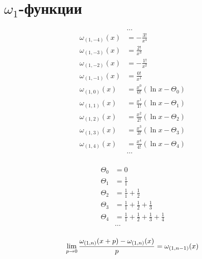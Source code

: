 
\section{$\omega_1$-функции}

\begin{equation*} \begin{aligned}
&\ldots \\
\omega_{(1, -4)}(x) &=
- \frac{3!}{x^4} \\
\omega_{(1, -3)}(x) &=
  \frac{2!}{x^3} \\
\omega_{(1, -2)}(x) &=
- \frac{1!}{x^2} \\
\omega_{(1, -1)}(x) &=
  \frac{0!}{x^1} \\
\omega_{(1, 0)}(x) &= 
  \frac{x^0}{0!} \left(
  \ln{x} - \Theta_0 \right) \\
\omega_{(1, 1)}(x) &= 
  \frac{x^1}{1!} \left(
  \ln{x} - \Theta_1 \right) \\
\omega_{(1, 2)}(x) &= 
  \frac{x^2}{2!} \left(
  \ln{x} - \Theta_2 \right) \\
\omega_{(1, 3)}(x) &= 
  \frac{x^3}{3!} \left(
  \ln{x} - \Theta_3 \right) \\
\omega_{(1, 4)}(x) &= 
  \frac{x^4}{4!} \left(
  \ln{x} - \Theta_4 \right) \\
&\ldots \\
\end{aligned} \end{equation*}

\begin{equation*} \begin{aligned}
\Theta_0 &= 0 \\
\Theta_1 &= 
  \frac{1}{1} \\
\Theta_2 &= 
  \frac{1}{1} 
+ \frac{1}{2} \\
\Theta_3 &= 
  \frac{1}{1} 
+ \frac{1}{2} 
+ \frac{1}{3} \\
\Theta_4 &= 
  \frac{1}{1} 
+ \frac{1}{2} 
+ \frac{1}{3} 
+ \frac{1}{4} \\
&\ldots \\
\end{aligned} \end{equation*}

\begin{equation*}
\lim_{p \to 0} \frac{\omega_{(1, n)}(x + p) - \omega_{(1, n)}(x)}{p} = \omega_{(1, n - 1)}(x) \\
\end{equation*}


